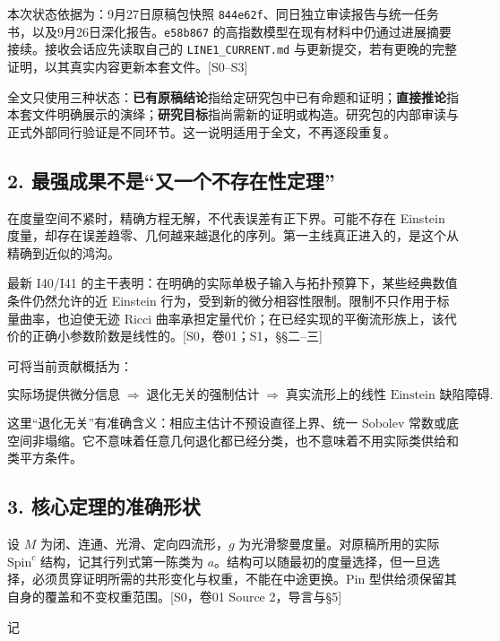 \documentclass[UTF8,a4paper,11pt,fontset=fandol]{ctexart}
\begin{document}
本次状态依据为：9月27日原稿包快照
\texttt{844e62f}、同日独立审读报告与统一任务书，以及9月26日深化报告。\texttt{e58b867}
的高指数模型在现有材料中仍通过进展摘要接续。接收会话应先读取自己的
\texttt{LINE1\_CURRENT.md}
与更新提交，若有更晚的完整证明，以其真实内容更新本套文件。{[}S0--S3{]}

全文只使用三种状态：\textbf{已有原稿结论}指给定研究包中已有命题和证明；\textbf{直接推论}指本套文件明确展示的演绎；\textbf{研究目标}指尚需新的证明或构造。研究包的内部审读与正式外部同行验证是不同环节。这一说明适用于全文，不再逐段重复。

\subsection{2.
最强成果不是``又一个不存在性定理''}\label{ux6700ux5f3aux6210ux679cux4e0dux662fux53c8ux4e00ux4e2aux4e0dux5b58ux5728ux6027ux5b9aux7406}

在度量空间不紧时，精确方程无解，不代表误差有正下界。可能不存在 Einstein
度量，却存在误差趋零、几何越来越退化的序列。第一主线真正进入的，是这个从精确到近似的鸿沟。

最新 I40/I41
的主干表明：在明确的实际单极子输入与拓扑预算下，某些经典数值条件仍然允许的近
Einstein
行为，受到新的微分相容性限制。限制不只作用于标量曲率，也迫使无迹 Ricci
曲率承担定量代价；在已经实现的平衡流形族上，该代价的正确小参数阶数是线性的。{[}S0，卷01；S1，§§二--三{]}

可将当前贡献概括为：

\[
\boxed{\text{实际场提供微分信息}
\;\Longrightarrow\;
\text{退化无关的强制估计}
\;\Longrightarrow\;
\text{真实流形上的线性 Einstein 缺陷障碍}.}
\]

这里``退化无关''有准确含义：相应主估计不预设直径上界、统一 Sobolev
常数或底空间非塌缩。它不意味着任意几何退化都已经分类，也不意味着不用实际类供给和类平方条件。

\subsection{3.
核心定理的准确形状}\label{ux6838ux5fc3ux5b9aux7406ux7684ux51c6ux786eux5f62ux72b6}

设 \(M\) 为闭、连通、光滑、定向四流形，\(g\)
为光滑黎曼度量。对原稿所用的实际 \(\mathrm{Spin}^c\)
结构，记其行列式第一陈类为
\(a\)。结构可以随最初的度量选择，但一旦选择，必须贯穿证明所需的共形变化与权重，不能在中途更换。Pin
型供给须保留其自身的覆盖和不变权重范围。{[}S0，卷01 Source
2，导言与§5{]}

记
\end{document}
